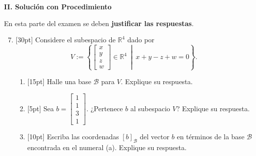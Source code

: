 \documentclass[11pt]{article}
\begin{document}
\newpage
\noindent\textbf{\large II. Solución con Procedimiento}

\vspace{4pt}
\noindent En esta parte del examen se deben \textbf{justificar las respuestas}.

\begin{enumerate}
\setcounter{enumi}{6}
\item{}[30pt] Considere el subespacio de $\mathbb{R}^4$ dado por
\[
V := \left\{\begin{bmatrix}x\\y\\z\\w\end{bmatrix}\in\mathbb{R}^4\ \middle|\ x+y-z+w=0\right\}.
\]
\begin{enumerate}
\item{}[15pt] Halle una base $\mathcal{B}$ para $V$. Explique su respuesta.

\vspace{6cm}

\item{}[5pt] Sea $b=\begin{bmatrix}1\\1\\3\\1\end{bmatrix}$. ¿Pertenece $b$ al subespacio $V$? Explique su respuesta.

\vspace{4cm}

\item{}[10pt] Escriba las coordenadas $[b]_{\mathcal{B}}$ del vector $b$ en términos de la base $\mathcal{B}$ encontrada en el numeral (a). Explique su respuesta.

\vspace{5cm}
\end{enumerate}
\end{enumerate}

\examfooter
\end{document}

